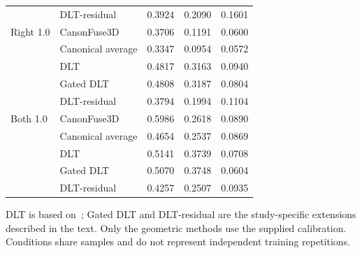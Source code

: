 \begin{table}[htbp]
\begin{tabular}{llrrr}
 & DLT-residual & 0.3924 & 0.2090 & 0.1601 \\
Right 1.0 & CanonFuse3D & 0.3706 & 0.1191 & 0.0600 \\
 & Canonical average & 0.3347 & 0.0954 & 0.0572 \\
 & DLT & 0.4817 & 0.3163 & 0.0940 \\
 & Gated DLT & 0.4808 & 0.3187 & 0.0804 \\
 & DLT-residual & 0.3794 & 0.1994 & 0.1104 \\
Both 1.0 & CanonFuse3D & 0.5986 & 0.2618 & 0.0890 \\
 & Canonical average & 0.4654 & 0.2537 & 0.0869 \\
 & DLT & 0.5141 & 0.3739 & 0.0708 \\
 & Gated DLT & 0.5070 & 0.3748 & 0.0604 \\
 & DLT-residual & 0.4257 & 0.2507 & 0.0935 \\
\bottomrule
\end{tabular}
\par\smallskip\begin{minipage}{\linewidth}\footnotesize DLT is based on~\cite{hartley2004multiple}; Gated DLT and DLT-residual are the study-specific extensions described in the text. Only the geometric methods use the supplied calibration. Conditions share samples and do not represent independent training repetitions.\end{minipage}
\end{table}

